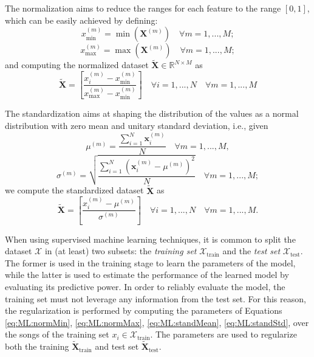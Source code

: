 The normalization aims to reduce the ranges for each feature to the range $[0,1]$, which can be easily achieved by defining:
\begin{equation}
x_{\text{min}}^{(m)}=\min(\mathbf{X}^{(m)}) \quad \forall m=1,...,M;
\label{eq:ML:normMin}
\end{equation}
\begin{equation}
x_{\text{max}}^{(m)}=\max(\mathbf{X}^{(m)}) \quad \forall m=1,...,M;
\label{eq:ML:normMax}
\end{equation}
and computing the normalized dataset $\tilde{\mathbf{X}}\in \mathbb{R}^{N \times M}$ as
\begin{equation}
\tilde{\mathbf{X}}=\left[ \frac{x^{(m)}_{i}-x_{\text{min}}^{(m)}}{x_{\text{max}}^{(m)}-x_{\text{min}}^{(m)}} \right] \quad \forall i =1,..., N \quad \forall m = 1,..., M
\end{equation}

The standardization aims at shaping the distribution of the values as a normal distribution with zero mean and unitary standard deviation, i.e., given
\begin{equation}
\mu^{(m)}=\frac{\sum_{i=1}^{N}\mathbf{x}_i^{(m)}}{N} \quad \forall m=1,...,M, 
\label{eq:ML:standMean}
\end{equation}
\begin{equation}
\sigma^{(m)}=\sqrt{\frac{\sum_{i=1}^{N}\left(\mathbf{x}_i^{(m)} - \mu^{(m)} \right)^2 }{N} }\quad \forall m=1,...,M;
\label{eq:ML:standStd}
\end{equation}
we compute the standardized dataset $\tilde{\mathbf{X}}$ as 
\begin{equation}
\tilde{\mathbf{X}}=\left[ \frac{x^{(m)}_{i}-\mu^{(m)}}{\sigma^{(m)}} \right] \quad \forall i =1,..., N \quad \forall m = 1,..., M.
\end{equation}

When using supervised machine learning techniques, it is common to split the dataset $\mathcal{X}$ in (at least) two subsets: the \textit{training set} $\mathcal{X}_{\text{train}}$ and the \textit{test set} $\mathcal{X}_{\text{test}}$. The former is used in the training stage to learn the parameters of the model, while the latter is used to estimate the performance of the learned model by evaluating its predictive power. In order to reliably evaluate the model, the training set must not leverage any information from the test set. For this reason, the regularization is performed by computing the parameters of Equations \ref{eq:ML:normMin}, \ref{eq:ML:normMax}, \ref{eq:ML:standMean}, \ref{eq:ML:standStd}, over the songs of the training set $x_i \in \mathcal{X}_{\text{train}}$. The parameters are used to regularize both the training $\tilde{\mathbf{X}}_{\text{train}}$ and test set  $\tilde{\mathbf{X}}_{\text{test}}$.


